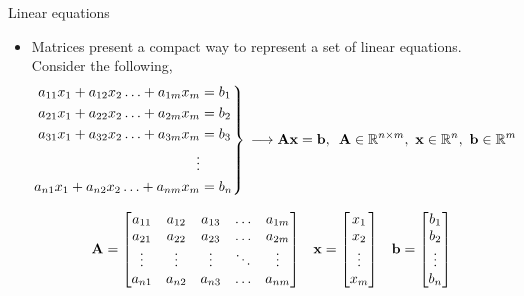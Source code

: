 \documentclass[aspectratio=169]{beamer}
\let\olditem\item
\renewcommand{\item}{\setlength{\itemsep}{\fill}\olditem}
\def\mf{\ensuremath\mathbf}
\begin{document}
\begin{frame}[t]{Linear equations}
\begin{itemize}
\item Matrices present a compact way to represent a set of linear equations. Consider the following,
\[
\begin{rcases*}
\begin{split}
a_{11}x_1 + a_{12}x_2 \ldots + a_{1m}x_m & = b_1 \\
a_{21}x_1 + a_{22}x_2 \ldots + a_{2m}x_m & = b_2 \\
a_{31}x_1 + a_{32}x_2 \ldots + a_{3m}x_m & = b_3 \\
\vdots \\
a_{n1}x_1 + a_{n2}x_2 \ldots + a_{nm}x_m & = b_n \\
\end{split}
\end{rcases*} \, \longrightarrow \mf{Ax} = \mf{b}, \,\,\, \mf{A} \in \mathbb{R}^{n \times m}, \,\, \mf{x} \in \mathbb{R}^n, \,\, \mf{b} \in \mathbb{R}^m
\]

\[
\mf{A} = \begin{bmatrix}
a_{11} & a_{12} & a_{13} & \ldots & a_{1m}\\
a_{21} & a_{22} & a_{23} & \ldots & a_{2m}\\
\vdots & \vdots & \vdots & \ddots & \vdots\\
a_{n1} & a_{n2} & a_{n3} & \ldots & a_{nm}\\
\end{bmatrix} \,\,\,\,\, 
\mf{x} = \begin{bmatrix}
x_1\\ x_2\\ \vdots \\ x_m
\end{bmatrix} \,\,\,\,\,
\mf{b} = \begin{bmatrix}
b_1\\ b_2\\ \vdots \\ b_n
\end{bmatrix}
\]
\end{itemize}
\end{frame}
\end{document}
